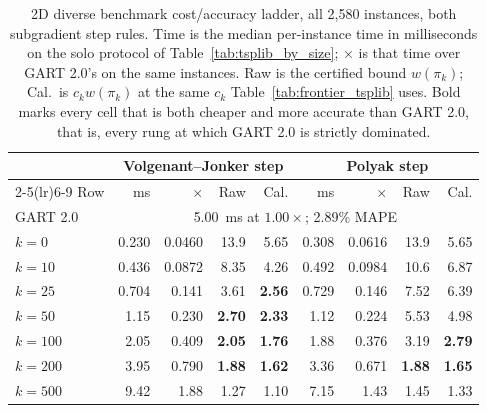 \begin{table}[!htbp]
\centering
\caption{2D diverse benchmark cost/accuracy ladder, all 2{,}580 instances, both subgradient step rules. Time is the median per-instance time in milliseconds on the solo protocol of Table~\ref{tab:tsplib_by_size}; $\times$ is that time over GART 2.0's on the same instances. Raw is the certified bound $w(\pi_k)$; Cal.\ is $c_k w(\pi_k)$ at the same $c_k$ Table~\ref{tab:frontier_tsplib} uses. Bold marks every cell that is both cheaper and more accurate than GART 2.0, that is, every rung at which GART 2.0 is strictly dominated.}
\label{tab:frontier_2d}
\setlength{\tabcolsep}{5pt}
\renewcommand{\arraystretch}{1.1}
\begin{tabular}{@{}lrrrrrrrr@{}}
\toprule
 & \multicolumn{4}{c}{Volgenant--Jonker step} & \multicolumn{4}{c}{Polyak step} \\
\cmidrule(lr){2-5}\cmidrule(lr){6-9}
Row & ms & $\times$ & Raw & Cal. & ms & $\times$ & Raw & Cal. \\
\midrule
GART 2.0 & \multicolumn{8}{c}{5.00~ms at $1.00\times$; 2.89\% MAPE} \\
$k=0$ & 0.230 & 0.0460 & 13.9 & 5.65 & 0.308 & 0.0616 & 13.9 & 5.65 \\
$k=10$ & 0.436 & 0.0872 & 8.35 & 4.26 & 0.492 & 0.0984 & 10.6 & 6.87 \\
$k=25$ & 0.704 & 0.141 & 3.61 & \textbf{2.56} & 0.729 & 0.146 & 7.52 & 6.39 \\
$k=50$ & 1.15 & 0.230 & \textbf{2.70} & \textbf{2.33} & 1.12 & 0.224 & 5.53 & 4.98 \\
$k=100$ & 2.05 & 0.409 & \textbf{2.05} & \textbf{1.76} & 1.88 & 0.376 & 3.19 & \textbf{2.79} \\
$k=200$ & 3.95 & 0.790 & \textbf{1.88} & \textbf{1.62} & 3.36 & 0.671 & \textbf{1.88} & \textbf{1.65} \\
$k=500$ & 9.42 & 1.88 & 1.27 & 1.10 & 7.15 & 1.43 & 1.45 & 1.33 \\
\bottomrule
\end{tabular}
\end{table}
